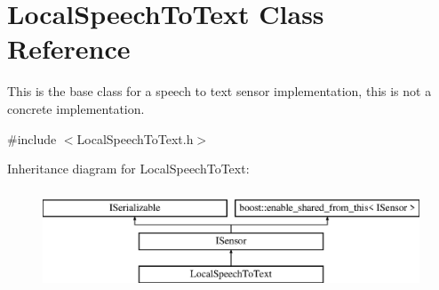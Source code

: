 \hypertarget{class_local_speech_to_text}{}\section{Local\+Speech\+To\+Text Class Reference}
\label{class_local_speech_to_text}


This is the base class for a speech to text sensor implementation, this is not a concrete implementation.  




{\ttfamily \#include $<$Local\+Speech\+To\+Text.\+h$>$}

Inheritance diagram for Local\+Speech\+To\+Text\+:\begin{figure}[H]
\begin{center}
\leavevmode
\includegraphics[height=3.000000cm]{class_local_speech_to_text}
\end{center}
\end{figure}
